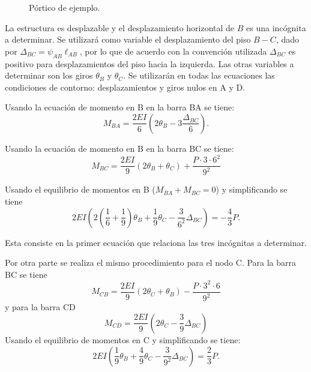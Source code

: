 \begin{figure}[htb]
	\centering
\def\svgwidth{0.55\textwidth}

	\caption{Pórtico de ejemplo.}
	\label{fig:ejem}
\end{figure}

La estructura es desplazable y el desplazamiento horizontal de $B$ es una incógnita a determinar. %
%
Se utilizará como variable el desplazamiento del piso $B-C$, dado por $\Delta_{BC} = \psi_{AB} \ell_{AB}$, por lo que de acuerdo con la convención utilizada $\Delta_{BC}$ es positivo para desplazamientos del piso hacia la izquierda.
Las otras variables a determinar son los giros $\theta_B$ y $\theta_C$. %
%
Se utilizarán en todas las ecuaciones las condiciones de contorno: desplazamientos y giros nulos en A y D.


Usando la ecuación de momento en B en la barra BA se tiene:
\begin{equation}
M_{BA} = \frac{2EI}{6} ( 2\theta_B - 3 \frac{ \Delta_{BC} } {6} ).
\end{equation}

Usando la ecuación de momento en B en la barra BC se tiene:
\begin{equation}
M_{BC} = \frac{2EI}{9} (2\theta_B +\theta_C ) + \frac{ P \cdot 3 \cdot 6^2}{9^2}
\end{equation}

Usando el equilibrio de momentos en B ($M_{BA}+M_{BC}=0$) y simplificando se tiene
\begin{equation}
\boxed{
	2EI \left( 2 \left( \frac{1}{6}+\frac{1}{9} \right) \theta_B + \frac{1}{9} \theta_C - \frac{3 }{6^2} \Delta_{BC} \right) = - \frac{4}{3} P.
}
\end{equation}

Esta consiste en la primer ecuación que relaciona las tres incógnitas a determinar.

Por otra parte se realiza el mismo procedimiento para el nodo C. Para la barra BC se tiene
\begin{equation}
M_{CB} = \frac{2EI}{9} (2\theta_C +\theta_B ) - \frac{P \cdot 3^2 \cdot 6}{9^2}
\end{equation}
y para la barra CD
\begin{equation}
M_{CD} = \frac{2EI}{9} (2\theta_C - \frac{3}{9} \Delta_{BC} )
\end{equation}
Usando el equilibrio de momentos en C y simplificando se tiene:
\begin{equation}
\boxed{
	2EI \left( \frac{1}{9} \theta_B + \frac{4}{9} \theta_C - \frac{3 }{9^2} \Delta_{BC} \right) = \frac{2}{3} P.
}
\end{equation}

